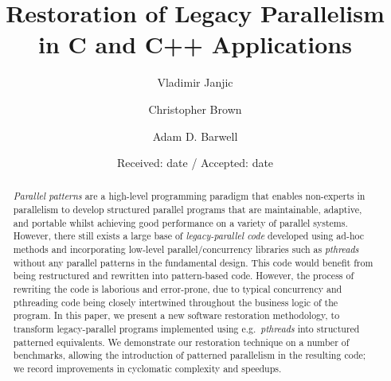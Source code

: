 \documentclass[smallextended]{svjour3}
\begin{document}
\title{Restoration of Legacy Parallelism in C and C++ Applications}
%
%
\author{Vladimir Janjic         \and
	Christopher Brown \and 
	Adam D. Barwell
}



\date{Received: date / Accepted: date}

\maketitle
%
\begin{abstract}
    \emph{Parallel patterns} are a high-level programming paradigm that enables non-experts in parallelism to develop structured parallel programs that are maintainable, adaptive, and portable whilst achieving good performance on a variety of parallel systems. However, there still exists a large base of \emph{legacy-parallel code} developed using ad-hoc methods and incorporating low-level parallel/concurrency libraries such as \emph{pthreads} without any parallel patterns in the fundamental design. This code would benefit from being restructured and rewritten into pattern-based code. However, the process of rewriting the code is laborious and error-prone, due to typical concurrency and pthreading code being closely intertwined throughout the business logic of the program. In this paper, we present a new software restoration methodology, to transform legacy-parallel programs implemented using e.g.\ \emph{pthreads} into structured patterned equivalents. We demonstrate our restoration technique on a number of benchmarks, allowing the introduction of patterned parallelism in the resulting code; we record improvements in cyclomatic complexity and speedups.

\end{abstract}

%
%




\end{document}
